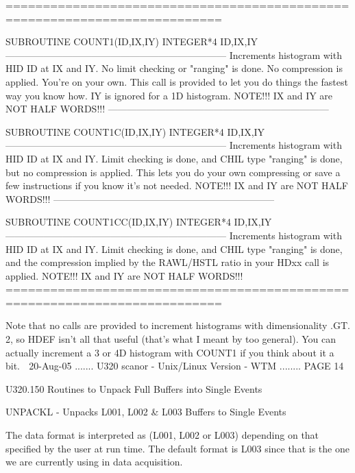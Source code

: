    ===========================================================================
 
         SUBROUTINE COUNT1(ID,IX,IY)
         INTEGER*4 ID,IX,IY
         ---------------------------------------------------------------------
         Increments histogram with HID ID at IX and IY. No limit
         checking or "ranging" is done. No compression is applied.
         You're on your own. This call is provided to let you do things
         the fastest way you know how. IY is ignored for a 1D histogram.
         NOTE!!! IX and IY are NOT HALF WORDS!!!
         ---------------------------------------------------------------------
 
         SUBROUTINE COUNT1C(ID,IX,IY)
         INTEGER*4 ID,IX,IY
         ---------------------------------------------------------------------
         Increments histogram with HID ID at IX and IY. Limit
         checking is done, and CHIL type "ranging" is done, but
         no compression is applied. This lets you do your own
         compressing or save a few instructions if you know it's
         not needed.
         NOTE!!! IX and IY are NOT HALF WORDS!!!
         ---------------------------------------------------------------------
 
         SUBROUTINE COUNT1CC(ID,IX,IY)
         INTEGER*4 ID,IX,IY
         ---------------------------------------------------------------------
         Increments histogram with HID ID at IX and IY. Limit
         checking is done, and CHIL type "ranging" is done, and
         the compression implied by the RAWL/HSTL ratio in your
         HDxx call is applied.
         NOTE!!! IX and IY are NOT HALF WORDS!!!
   ===========================================================================
 
 
   Note  that  no  calls   are   provided   to   increment   histograms   with
   dimensionality  .GT.  2, so HDEF isn't all that useful (that's what I meant
   by too general). You can actually  increment  a  3  or  4D  histogram  with
   COUNT1 if you think about it a bit.
    
   20-Aug-05 ....... U320  scanor - Unix/Linux Version - WTM ........ PAGE  14
 
 
   U320.150  Routines to Unpack Full Buffers into Single Events
 
 
   UNPACKL - Unpacks L001, L002 & L003 Buffers to Single Events
 
   The  data  format  is interpreted as (L001, L002 or L003) depending on that
   specified by the user at run time. The default format is  L003  since  that
   is the one we are currently using in data acquisition.
 
